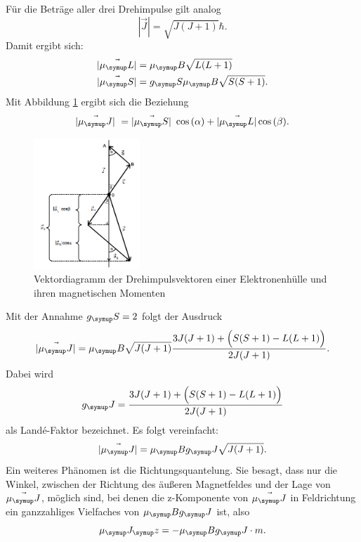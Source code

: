 Für die Beträge aller drei Drehimpulse gilt analog
\begin{equation}
  |\vec{J}| = \sqrt{J(J+1)} \hbar.
\end{equation}
Damit ergibt sich:
\begin{align}
  |\vec{\mu_\su{L}}| &= \mu_\su{B}\sqrt{L(L+1)} \\
  |\vec{\mu_\su{S}}| &= g_\su{S}\mu_\su{B}\sqrt{S(S+1)}.
\end{align}
Mit Abbildung \ref{fig:drehimpuls} ergibt sich die Beziehung
\begin{equation}
  |\vec{\mu_\su{J}}| = |\vec{\mu_\su{S}}| \cos{(\alpha)} + |\vec{\mu_\su{L}}|
  \cos{(\beta)}.
\end{equation}
  \begin{figure}
  \centering
  \includegraphics[width=4cm]{bilder/drehimpuls.png}
  \caption{Vektordiagramm der Drehimpulsvektoren einer Elektronenhülle und ihren
  magnetischen Momenten \cite{606}}
  \label{fig:drehimpuls}
\end{figure}
Mit der Annahme $g_\su{S} = 2$ folgt der Ausdruck
\begin{equation}
  |\vec{\mu_\su{J}}| = \mu_\su{B} \sqrt{J(J+1)} \frac{3J(J+1)+\Big(S(S+1)
  -L(L+1)\Big)}{2J(J+1)}.
\end{equation}
Dabei wird
\begin{equation}
  g_\su{J} = \frac{3J(J+1)+\Big(S(S+1) -L(L+1)\Big)}{2J(J+1)} \label{eqn:lande}
\end{equation}
als Landé-Faktor bezeichnet.
Es folgt vereinfacht:
\begin{equation}
  |\vec{\mu_\su{J}}| = \mu_\su{B} g_\su{J} \sqrt{J(J+1)}.
\end{equation}
Ein weiteres Phänomen ist die Richtungsquantelung. Sie besagt, dass nur die Winkel,
zwischen der Richtung des äußeren Magnetfeldes und der Lage von $\vec{\mu_\su{J}}$,
möglich sind, bei denen die z-Komponente von $\vec{\mu_\su{J}}$ in Feldrichtung
ein ganzzahliges Vielfaches von $\mu_\su{B}g_\su{J}$ ist, also
\begin{equation}
  \mu_\su{J_\su{z}} = -\mu_\su{B}g_\su{J}\cdot m. \label{eqn:ori}
\end{equation}
